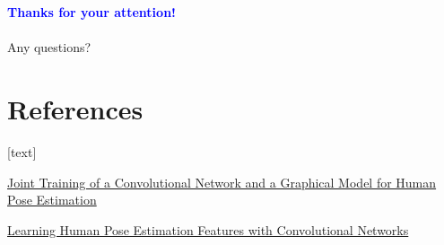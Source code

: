 \documentclass{beamer}
\newcommand\blue[1]{\textcolor{blue}{\textbf{#1}}}
\begin{document}
	\begin{frame}[plain,c]
		\begin{center}
			\Huge \blue{Thanks for your attention!} \\ \ \\
			Any questions? \\
		\end{center}
	\end{frame}
	
	
	\section*{References}
	\begin{thebibliography}{}
		
		\href{https://arxiv.org/abs/1406.2984}
		{Joint Training of a Convolutional Network and a Graphical Model for Human Pose Estimation}

		\href{https://arxiv.org/abs/1312.7302}
		{Learning Human Pose Estimation Features with Convolutional Networks}
	\end{thebibliography} 
\end{document}
